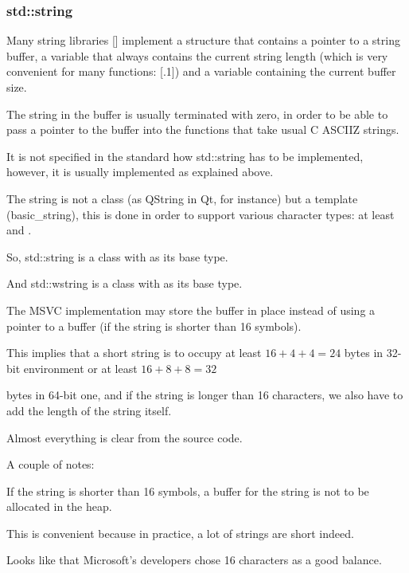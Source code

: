 \subsubsection{std::string}
\label{std_string}


Many string libraries [] implement a structure that contains a pointer to a string buffer,
a variable that always contains the current string length 
(which is very convenient for many functions: [.1]) and
a variable containing the current buffer size.

The string in the buffer is usually terminated with zero, in order to be able to pass a pointer to the buffer
into the functions that take  usual C \ac{ASCIIZ} strings.

It is not specified in the \Cpp standard how std::string has to be implemented,
however, it is usually implemented as explained above.

The \Cpp string is not a class (as QString in Qt, for instance) but a template (basic\_string),
this is done in order to support various character types: at least \Tchar and .

So, std::string is a class with \Tchar as its base type.

And std::wstring is a class with  as its base type.


The MSVC implementation may store the buffer in place instead of using a pointer to a buffer 
(if the string is shorter than 16 symbols).

This implies that a short string is to occupy at least $16 + 4 + 4 = 24$ 
bytes in 32-bit environment or at least $16 + 8 + 8 = 32$ 

bytes in 64-bit one, and if the string is longer than 16 characters, we also have to add the length of the string itself.



Almost everything is clear from the source code.

A couple of notes:

If the string is shorter than 16 symbols, 
a buffer for the string is not to be allocated in the \gls{heap}.

This is convenient because
in practice, a lot of strings are short indeed.

Looks like that Microsoft's developers chose 16 characters as a good balance.

